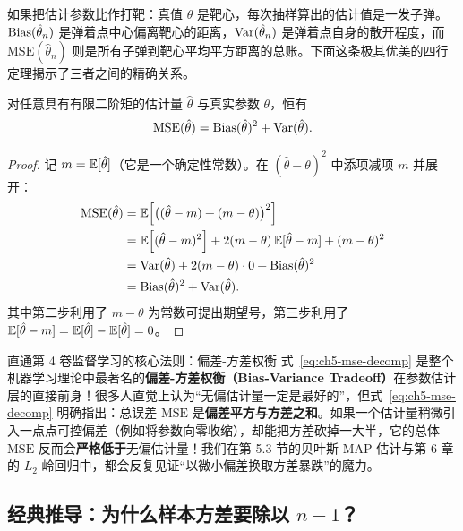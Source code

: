 如果把估计参数比作打靶：真值 $\theta$ 是靶心，每次抽样算出的估计值是一发子弹。$\operatorname{Bias}(\hat{\theta}_n)$ 是弹着点中心偏离靶心的距离，$\operatorname{Var}(\hat{\theta}_n)$ 是弹着点自身的散开程度，而 $\mathrm{MSE}(\hat{\theta}_n)$ 则是所有子弹到靶心平均平方距离的总账。下面这条极其优美的四行定理揭示了三者之间的精确关系。

\begin{thmBox}
\begin{theorem}
\label{thm:ch5-mse-decomp}
对任意具有有限二阶矩的估计量 $\hat{\theta}$ 与真实参数 $\theta$，恒有
\begin{equation}
  \mathrm{MSE}(\hat{\theta}) = \operatorname{Bias}(\hat{\theta})^2 + \operatorname{Var}(\hat{\theta}).
  \label{eq:ch5-mse-decomp}
\end{equation}
\end{theorem}
\end{thmBox}

\begin{proof}
记 $m = \mathbb{E}[\hat{\theta}]$（它是一个确定性常数）。在 $(\hat{\theta} - \theta)^2$ 中添项减项 $m$ 并展开：
\begin{align*}
  \mathrm{MSE}(\hat{\theta})
  &= \mathbb{E}\!\left[\big((\hat{\theta} - m) + (m - \theta)\big)^2\right] \\
  &= \mathbb{E}\!\left[(\hat{\theta} - m)^2\right] + 2(m - \theta)\,\mathbb{E}[\hat{\theta} - m] + (m - \theta)^2 \\
  &= \operatorname{Var}(\hat{\theta}) + 2(m - \theta)\cdot 0 + \operatorname{Bias}(\hat{\theta})^2 \\
  &= \operatorname{Bias}(\hat{\theta})^2 + \operatorname{Var}(\hat{\theta}).
\end{align*}
其中第二步利用了 $m - \theta$ 为常数可提出期望号，第三步利用了 $\mathbb{E}[\hat{\theta} - m] = \mathbb{E}[\hat{\theta}] - \mathbb{E}[\hat{\theta}] = 0$。
\end{proof}

\begin{insightBox}{直通第 4 卷监督学习的核心法则：偏差-方差权衡}
式~\eqref{eq:ch5-mse-decomp} 是整个机器学习理论中最著名的\textbf{偏差-方差权衡（Bias-Variance Tradeoff）}在参数估计层的直接前身！很多人直觉上认为“无偏估计量一定是最好的”，但式~\eqref{eq:ch5-mse-decomp} 明确指出：总误差 $\mathrm{MSE}$ 是\textbf{偏差平方与方差之和}。如果一个估计量稍微引入一点点可控偏差（例如将参数向零收缩），却能把方差砍掉一大半，它的总体 $\mathrm{MSE}$ 反而会\textbf{严格低于}无偏估计量！我们在第 5.3 节的贝叶斯 MAP 估计与第 6 章的 $L_2$ 岭回归中，都会反复见证“以微小偏差换取方差暴跌”的魔力。
\end{insightBox}

\subsection{经典推导：为什么样本方差要除以 $n-1$？}
\label{subsec:ch5-bessel}

